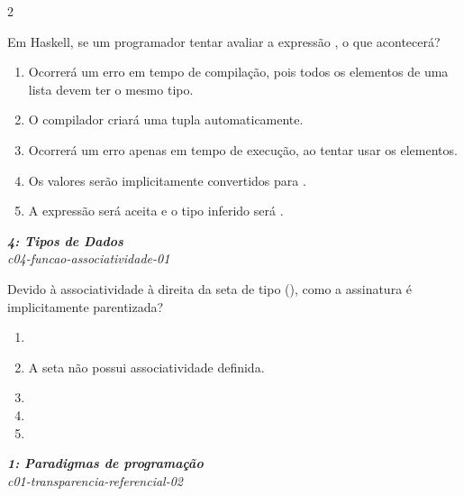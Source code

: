 \documentclass[a4paper,10pt,brazil]{article}
\begin{document}
\begin{multicols}{2}
\begin{flushright}
\end{flushright}
Em Haskell, se um programador tentar avaliar a expressão , o que acontecerá?

\begin{enumerate}
  \item Ocorrerá um erro em tempo de compilação, pois todos os elementos de uma lista devem ter o mesmo tipo.

  \item O compilador criará uma tupla automaticamente.

  \item Ocorrerá um erro apenas em tempo de execução, ao tentar usar os elementos.

  \item Os valores serão implicitamente convertidos para .

  \item A expressão será aceita e o tipo inferido será .


\end{enumerate}

\begin{flushright}
  \footnotesize
  \textit{\textbf{4: Tipos de Dados}}\\
  \textit{c04-funcao-associatividade-01}\\

\end{flushright}
Devido à associatividade à direita da seta de tipo (\haskellinline{->}), como a assinatura  é implicitamente parentizada?

\begin{enumerate}
  \item {}

  \item A seta não possui associatividade definida.

  \item {}

  \item {}

  \item {}


\end{enumerate}

\begin{flushright}
  \footnotesize
  \textit{\textbf{1: Paradigmas de programação}}\\
  \textit{c01-transparencia-referencial-02}\\


\end{flushright}
\end{multicols}
\end{document}

